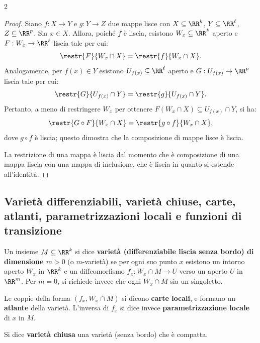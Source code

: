 \begin{multicols*}{2}
    \begin{proof}
        Siano $f : X \to Y$ e $g : Y \to Z$ due mappe lisce con $X \subseteq \RR^k$,
        $Y \subseteq \RR^\ell$, $Z \subseteq \RR^p$. Sia $x \in X$. Allora,
        poiché $f$ è liscia, esistono $W_x \subseteq \RR^k$ aperto e $F : W_x \to \RR^\ell$ liscia tale per cui:
        \[
            \restr{F}{W_x \cap X} = \restr{f}{W_x \cap X}.
        \]
        Analogamente, per $f(x) \in Y$ esistono $U_{f(x)} \subseteq \RR^\ell$ aperto e
        $G : U_{f(x)} \to \RR^p$ liscia tale per cui:
        \[
            \restr{G}{U_{f(x)} \cap Y} = \restr{g}{U_{f(x)} \cap Y}.
        \]
        Pertanto, a meno di restringere $W_x$ per ottenere $F(W_x \cap X) \subseteq U_{f(x)} \cap Y$,
        si ha:
        \[
            \restr{G \circ F}{W_x \cap X} = \restr{g \circ f}{W_x \cap X},
        \]
        dove $g \circ f$ è liscia; questo dimostra che la composizione di mappe
        lisce è liscia. \smallskip

        La restrizione di una mappa è liscia dal momento che è composizione
        di una mappa liscia con una mappa di inclusione, che è liscia in quanto
        si estende all'identità.
    \end{proof}

    \subsection{Varietà differenziabili, varietà chiuse, carte, atlanti, parametrizzazioni locali e funzioni di transizione}

    \begin{definition}
        Un insieme $M \subseteq \RR^k$ si dice \textbf{varietà (differenziabile liscia senza bordo) di dimensione $m>0$} (o $m$-varietà) se per ogni
        suo punto $x$ esistono un intorno aperto $W_x$ in $\RR^k$ e un diffeomorfismo
        $f_x : W_x \cap M \to U$ verso un aperto $U$ in $\RR^m$. Per $m = 0$, si richiede invece
        che ogni $W_x \cap M$ sia un singoletto. \smallskip

        Le coppie della forma $(f_x, W_x \cap M)$ si dicono \textbf{carte locali}, e formano un \textbf{atlante} della varietà. L'inversa di
        $f_x$ si dice invece \textbf{parametrizzazione locale} di $x$ in $M$.
    \end{definition}

    \begin{definition}
        Si dice \textbf{varietà chiusa} una varietà (senza bordo) che è compatta.
    \end{definition}


\end{multicols*}

